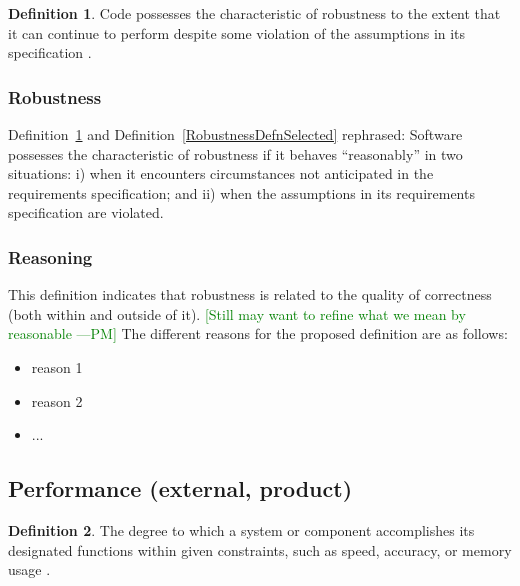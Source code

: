 \documentclass[letterpaper, cleveref]{lipics-v2019}
\newcommand{\authornote}[3]{\textcolor{#1}{[#3 ---#2]}}
\newcommand{\authornote}[3]{}
\newcommand{\pmi}[1]{\authornote{green}{PM}{#1}} %
\theoremstyle{definition}
\newtheorem{defn}{Definition}
\begin{document}
\begin{defn} \label{RobustnessPartialDefn}
	Code possesses the characteristic of robustness to the extent that it can
	continue to perform despite some violation of the assumptions in its 
	specification \citep{boehm2007software}.
\end{defn}

\begin{mybox}
\subsubsection*{Robustness}
Definition~\ref{RobustnessPartialDefn} and
Definition~\ref{RobustnessDefnSelected} rephrased: Software possesses the
characteristic of robustness if it behaves ``reasonably'' in two situations: i)
when it encounters circumstances not anticipated in the requirements
specification; and ii) when the assumptions in its requirements specification
are violated.
\end{mybox}

\subsubsection*{Reasoning}

This definition indicates that robustness is related to the quality of
correctness (both within and outside of it). \pmi{Still may want to refine what
we mean by reasonable}  The different reasons for the proposed definition are as
follows:

\begin{itemize}
  \item reason 1
  \item reason 2
  \item ...
\end{itemize}


\subsection{Performance (external, product)} %

\begin{defn} \label{PerformanceDefnSelected}
  The degree to which a system or component accomplishes its designated
  functions within given constraints, such as speed, accuracy, or memory
  usage \citep{IEEEStdGlossarySET1990}.
\end{defn}
\end{document}

